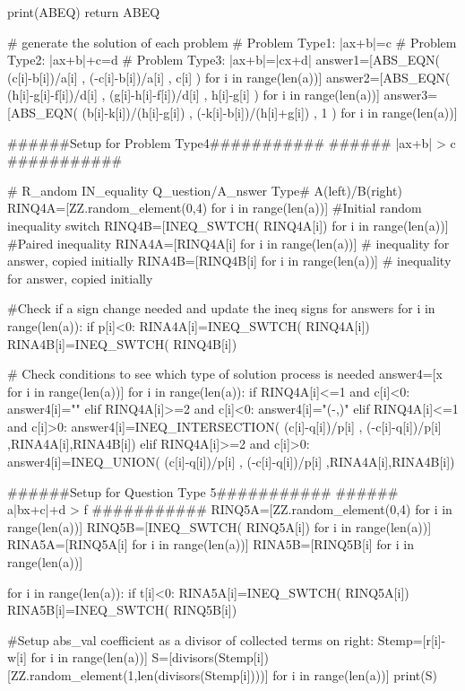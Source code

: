 \documentclass{article}%
\begin{document}
\begin{sagesilent}
  print(ABEQ)
  return ABEQ
  
    

# generate the solution of each problem 
# Problem Type1: |ax+b|=c
# Problem Type2: |ax+b|+c=d
# Problem Type3: |ax+b|=|cx+d|
answer1=[ABS_EQN(  (c[i]-b[i])/a[i] , (-c[i]-b[i])/a[i] , c[i] )   for i in range(len(a))]
answer2=[ABS_EQN(  (h[i]-g[i]-f[i])/d[i] , (g[i]-h[i]-f[i])/d[i] , h[i]-g[i] )   for i in range(len(a))]
answer3=[ABS_EQN(  (b[i]-k[i])/(h[i]-g[i]) , (-k[i]-b[i])/(h[i]+g[i]) , 1 )   for i in range(len(a))]




######Setup for Problem Type4###########    
######      |ax+b| > c       ###########

# R_andom IN_equality Q_uestion/A_nswer Type# A(left)/B(right)
RINQ4A=[ZZ.random_element(0,4) for i in range(len(a))] #Initial random inequality switch
RINQ4B=[INEQ_SWTCH( RINQ4A[i]) for i in range(len(a))] #Paired inequality  
RINA4A=[RINQ4A[i] for i in range(len(a))]              # inequality for answer, copied initially
RINA4B=[RINQ4B[i] for i in range(len(a))]              # inequality for answer, copied initially

#Check if a sign change needed and update the ineq signs for answers
for i in range(len(a)):
  if p[i]<0:
    RINA4A[i]=INEQ_SWTCH( RINQ4A[i])
    RINA4B[i]=INEQ_SWTCH( RINQ4B[i])
   
# Check conditions to see which type of solution process is needed    
answer4=[x for i in range(len(a))]
for i in range(len(a)):
  if RINQ4A[i]<=1 and c[i]<0:
    answer4[i]="\emptyset"
  elif RINQ4A[i]>=2 and c[i]<0:
    answer4[i]="(-\infty,\infty)"
  elif RINQ4A[i]<=1 and c[i]>0: 
    answer4[i]=INEQ_INTERSECTION(  (c[i]-q[i])/p[i]  ,  (-c[i]-q[i])/p[i]  ,RINA4A[i],RINA4B[i])
  elif RINQ4A[i]>=2 and c[i]>0: 
    answer4[i]=INEQ_UNION(  (c[i]-q[i])/p[i]  ,  (-c[i]-q[i])/p[i]  ,RINA4A[i],RINA4B[i])  

    
    
    
######Setup for Question Type 5###########  
######      a|bx+c|+d > f      ########### 
RINQ5A=[ZZ.random_element(0,4) for i in range(len(a))]
RINQ5B=[INEQ_SWTCH( RINQ5A[i]) for i in range(len(a))]
RINA5A=[RINQ5A[i] for i in range(len(a))]
RINA5B=[RINQ5B[i] for i in range(len(a))]

for i in range(len(a)):
  if t[i]<0:
    RINA5A[i]=INEQ_SWTCH( RINQ5A[i])
    RINA5B[i]=INEQ_SWTCH( RINQ5B[i])

    
#Setup abs_val coefficient as a divisor of collected terms on right:
Stemp=[r[i]-w[i]  for i in range(len(a))]
S=[divisors(Stemp[i])[ZZ.random_element(1,len(divisors(Stemp[i])))]  for i in range(len(a))]
print(S) 
 

\end{sagesilent}
\end{document}
